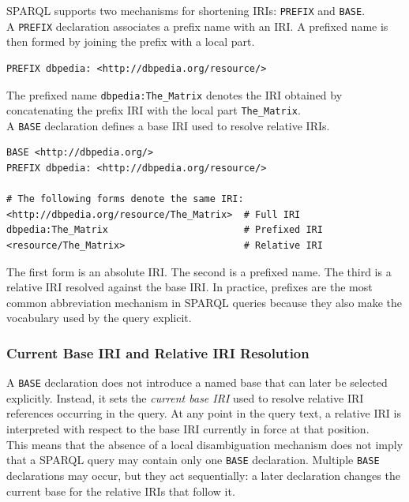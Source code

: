 \documentclass{scrbook}
\begin{document}
	SPARQL supports two mechanisms for shortening IRIs: \texttt{PREFIX} and \texttt{BASE}.\\
	
	A \texttt{PREFIX} declaration associates a prefix name with an IRI. A prefixed name is then formed by joining the prefix with a local part.
	
	\begin{lstlisting}
PREFIX dbpedia: <http://dbpedia.org/resource/>
	\end{lstlisting}
	
	The prefixed name \texttt{dbpedia:The\_Matrix} denotes the IRI obtained by concatenating the prefix IRI with the local part \texttt{The\_Matrix}.\\
	
	A \texttt{BASE} declaration defines a base IRI used to resolve relative IRIs.
	
	\begin{lstlisting}
BASE <http://dbpedia.org/>
PREFIX dbpedia: <http://dbpedia.org/resource/>

# The following forms denote the same IRI:
<http://dbpedia.org/resource/The_Matrix>  # Full IRI
dbpedia:The_Matrix                        # Prefixed IRI
<resource/The_Matrix>                     # Relative IRI
	\end{lstlisting}
	
	The first form is an absolute IRI. The second is a prefixed name. The third is a relative IRI resolved against the base IRI. In practice, prefixes are the most common abbreviation mechanism in SPARQL queries because they also make the vocabulary used by the query explicit.
	
	\subsubsection{Current Base IRI and Relative IRI Resolution}
	
	A \texttt{BASE} declaration does not introduce a named base that can later be selected explicitly. Instead, it sets the \emph{current base IRI} used to resolve relative IRI references occurring in the query. At any point in the query text, a relative IRI is interpreted with respect to the base IRI currently in force at that position.\\
	
	This means that the absence of a local disambiguation mechanism does not imply that a SPARQL query may contain only one \texttt{BASE} declaration. Multiple \texttt{BASE} declarations may occur, but they act sequentially: a later declaration changes the current base for the relative IRIs that follow it.
	
\end{document}
